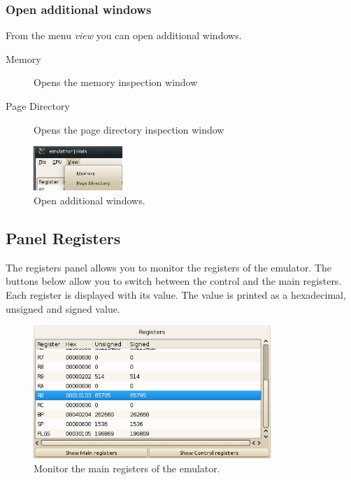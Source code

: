 \subsubsection{Open additional windows}
From the menu \emph{view} you can open additional windows.
\begin{description}
\item[Memory] Opens the memory inspection window
\item[Page Directory] Opens the page directory inspection window
\end{description}

\begin{figure}[H]
\begin{center}
	\includegraphics[width=0.3\textwidth]{./files/emu_gui_menu_view.png}
\end{center}
	\caption{Open additional windows.}
\end{figure}

\subsection{Panel Registers}
The registers panel allows you to monitor the registers of the emulator. The buttons below allow you to switch between the control and the main registers. Each register is displayed with its value. The value is printed as a hexadecimal, unsigned and signed value. 

\begin{figure}[H]
\begin{center}
	\includegraphics[width=0.8\textwidth]{./files/emu_gui_registers_main.png}
\end{center}
	\caption{Monitor the main registers of the emulator.}
\end{figure}

